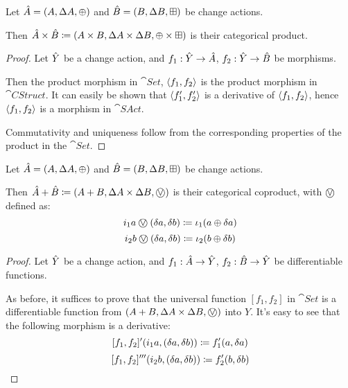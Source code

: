 \begin{prop}[Products]
  Let $\hat{A} = (A,\Delta A,\oplus)$ and $\hat{B} =
  (B,\Delta B,\boxplus)$ be change actions.

  Then $\hat{A} \times \hat{B} \coloneqq (A \times B,\Delta A \times
  \Delta B,\oplus \times \boxplus)$ is their categorical product.
\end{prop}
\ifproofs
\begin{proof}
  Let $\hat{Y}$ be a change action, and $f_1: \hat{Y} \rightarrow \hat{A}$, $f_2: \hat{Y}
  \rightarrow \hat{B}$ be morphisms.

  Then the product morphism in $\cat{Set}$, $\left\langle {f_1}, {f_2} \right\rangle$ is the product
  morphism in $\cat{CStruct}$. It can easily be
  shown that $\left\langle {f_1'}, {f_2'} \right\rangle$ is a derivative of $\left\langle {f_1}, {f_2} \right\rangle$,
  hence $\left\langle {f_1}, {f_2} \right\rangle$ is a morphism in $\cat{SAct}$.

  Commutativity and uniqueness follow from the corresponding properties of the
  product in the $\cat{Set}$.
\end{proof}
\fi

\begin{prop}[Coproducts]
  Let $\hat{A} = (A,\Delta A,\oplus)$ and $\hat{B} =
  (B,\Delta B,\boxplus)$ be change actions.

  Then $\cstr{A} + \cstr{B} \defeq \cstruct{A + B}{\changes{A} \times
  \changes{B}}{\cplusvee}$ is their categorical coproduct, with $\cplusvee$ defined as:
  $$i_1 a \cplusvee (\change{a}, \change{b}) \defeq \iota_1 (a \cplus \change{a})$$
  $$i_2 b \cplusvee (\change{a}, \change{b}) \defeq \iota_2 (b \cplus \change{b})$$
\end{prop}
\ifproofs
\begin{proof}
  Let $\hat{Y}$ be a change action, and $f_1 : \hat{A} \rightarrow \hat{Y}$, $f_2 : \hat{B}
  \rightarrow \hat{Y}$ be differentiable functions.

  As before, it suffices to prove that the universal function $[f_1, f_2]$ in $\cat{Set}$ is a differentiable
  function from $\cstruct{A + B}{\changes{A} \times \changes{B}}{\cplusvee}$ into $Y$. It's easy to see 
  that the following morphism is a derivative:
  $$[f_1, f_2]' (i_1 a, (\delta a, \delta b)) \coloneqq f_1'(a, \delta a)$$
  $$[f_1, f_2]''' (i_2 b, (\delta a, \delta b)) \coloneqq f_2'(b, \delta b)$$
\end{proof}
\fi

